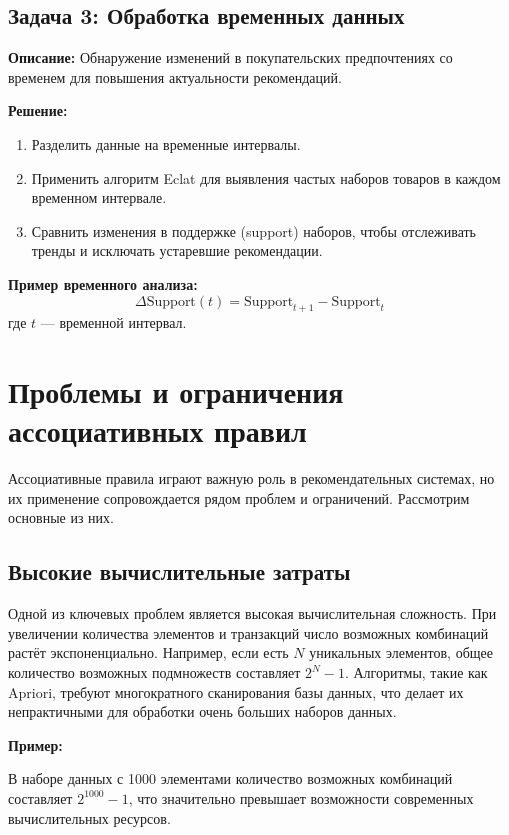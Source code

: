 \subsection{Задача 3: Обработка временных данных}
\textbf{Описание:}
Обнаружение изменений в покупательских предпочтениях со временем для повышения актуальности рекомендаций.

\textbf{Решение:}
\begin{enumerate}
    \item Разделить данные на временные интервалы.
    \item Применить алгоритм Eclat для выявления частых наборов товаров в каждом временном интервале.
    \item Сравнить изменения в поддержке (support) наборов, чтобы отслеживать тренды и исключать устаревшие рекомендации.
\end{enumerate}

\textbf{Пример временного анализа:}
\begin{equation}
    \Delta \text{Support}(t) = \text{Support}_{t+1} - \text{Support}_{t}
\end{equation}
где $t$ — временной интервал.



\section{Проблемы и ограничения ассоциативных правил}

Ассоциативные правила играют важную роль в рекомендательных системах, но их применение сопровождается рядом проблем и ограничений. Рассмотрим основные из них.

\subsection{Высокие вычислительные затраты}

Одной из ключевых проблем является высокая вычислительная сложность. При увеличении количества элементов и транзакций число возможных комбинаций растёт экспоненциально. Например, если есть $N$ уникальных элементов, общее количество возможных подмножеств составляет $2^N - 1$. Алгоритмы, такие как Apriori, требуют многократного сканирования базы данных, что делает их непрактичными для обработки очень больших наборов данных.

\textbf{Пример:}

В наборе данных с 1000 элементами количество возможных комбинаций составляет $2^{1000} - 1$, что значительно превышает возможности современных вычислительных ресурсов.

